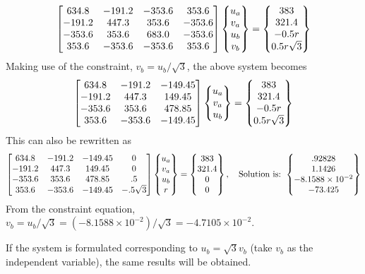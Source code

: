\begin{example}
{}
\begin{equation*}
  \begin{bmatrix}634.8 & -191.2 & -353.6 & 353.6\\ -191.2 & 447.3 & 353.6 & -353.6\\ -353.6 & 353.6 & 683.0 & -353.6\\ 353.6 & -353.6 & -353.6 & 353.6\end{bmatrix}\begin{Bmatrix}u_a\\ v_a\\ u_b\\ v_b\end{Bmatrix} = \begin{Bmatrix}383\\ 321.4\\ -0.5r\\ 0.5r\sqrt3\end{Bmatrix}
\end{equation*}
Making use of the constraint, $v_b = u_b/\sqrt3$, the above system becomes
\begin{equation*}
  \begin{bmatrix}634.8 & -191.2 & -149.45\\ -191.2 & 447.3 & 149.45\\ -353.6 & 353.6 & 478.85\\ 353.6 & -353.6 & -149.45\end{bmatrix}\begin{Bmatrix}u_a\\ v_a\\ u_b\end{Bmatrix} = \begin{Bmatrix}383\\ 321.4\\ -0.5r\\ 0.5r\sqrt3\end{Bmatrix}
\end{equation*}
This can also be rewritten as
\begin{equation*}
  \begin{bmatrix}634.8 & -191.2 & -149.45 & 0\\ -191.2 & 447.3 & 149.45 & 0\\ -353.6 & 353.6 & 478.85 & .5\\ 353.6 & -353.6 & -149.45 & -.5\sqrt3\end{bmatrix}\begin{Bmatrix}u_a\\ v_a\\ u_b\\ r\end{Bmatrix} = \begin{Bmatrix}383\\ 321.4\\ 0\\ 0\end{Bmatrix},\quad
  \text{Solution is: }\begin{Bmatrix}.92828\\ 1.1426\\ -8.1588\times10^{-2}\\ -73.425\end{Bmatrix}
\end{equation*}
From the constraint equation, $v_b = u_b/\sqrt3 = (-8.1588\times10^{-2})/\sqrt3 = -4.7105\times10^{-2}$.

If the system is formulated corresponding to $u_b = \sqrt3v_b$ (take $v_b$ as the independent variable), the same results will be obtained.
\end{example}

